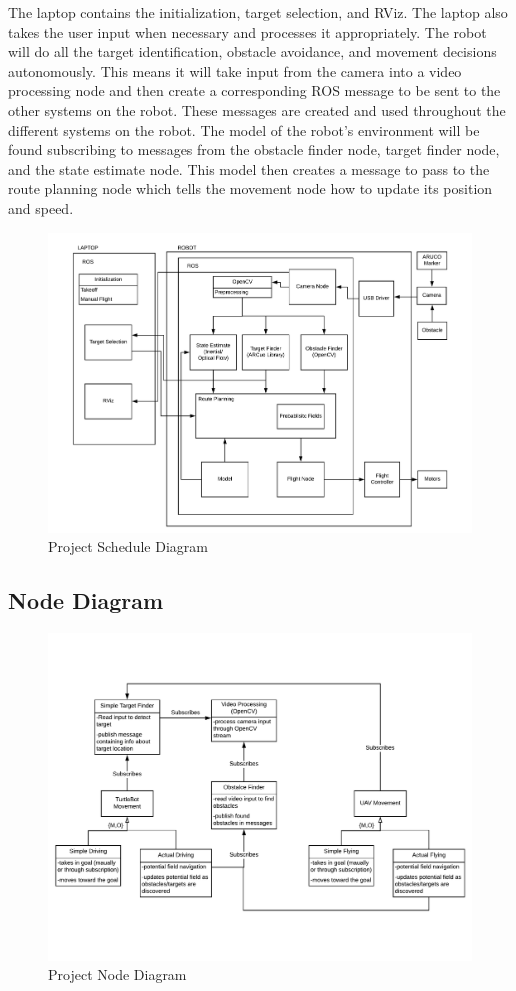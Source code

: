 \documentclass{article}
\begin{document}
	The laptop contains the initialization, target selection, and RViz. The laptop also takes the user input when necessary and processes it appropriately.  The robot will do all the target identification, obstacle avoidance, and movement decisions autonomously. This means it will take input from the camera into a video processing node and then create a corresponding ROS message to be sent to the other systems on the robot. These messages are created and used throughout the different systems on the robot. The model of the robot's environment will be found subscribing to messages from the obstacle finder node, target finder node, and the state estimate node. This model then creates a message to pass to the route planning node which tells the movement node how to update its position and speed. 

	\begin{figure}
		\centering
		\includegraphics[width=0.9\linewidth]{BlockDiagram}
		\caption{Project Schedule Diagram}
		\label{fig:blockdiagram}
	\end{figure}

	\subsection{Node Diagram}

	\begin{figure}
		\centering
		\includegraphics[width=0.9\linewidth]{NodeDiagram}
		\caption{Project Node Diagram}
		\label{fig:nodediagram}
	\end{figure}
\end{document}
